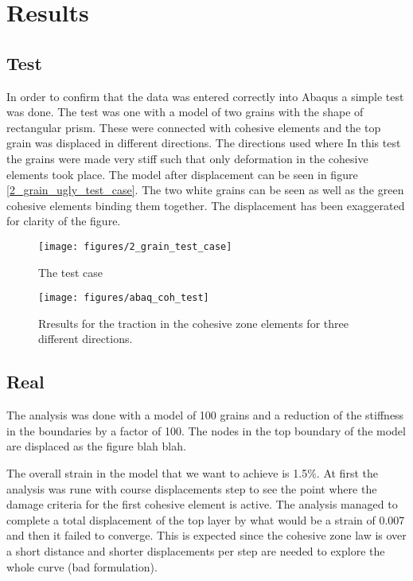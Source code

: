\documentclass[convergence.tex]{subfiles}
\begin{document}
\chapter{Results}

\section{Test}

In order to confirm that the data was entered correctly into Abaqus a simple test was done. The test was one with a model of two grains with the shape of rectangular prism. These were connected with cohesive elements and the top grain was displaced in different directions. The directions used where  In this test the grains were made very stiff such that only deformation in the cohesive elements took place. The model after displacement can be seen in figure \ref{2_grain_ugly_test_case}. The two white grains can be seen as well as the green cohesive elements binding them together. The displacement has been exaggerated for clarity of the figure.

\begin{figure}[ht]
\centering
\texttt{[image: figures/2\_grain\_test\_case]}
\caption{The test case}
\label{fig:test_case}
\end{figure}


\begin{figure}[ht]
\centering
\texttt{[image: figures/abaq\_coh\_test]}
\caption{Rresults for the traction in the cohesive zone elements for three different directions.}
\label{fig:test_case}
\end{figure}

\section{Real}
The analysis was done with a model of 100 grains and a reduction of the stiffness in the boundaries by a factor of 100. The nodes in the top boundary of the model are displaced as the figure blah blah.

The overall strain in the model that we want to achieve is 1.5\%. At first the analysis was rune with course displacements step to see the point where the damage criteria for the first cohesive element is active. The analysis managed to complete a total displacement of the top layer by what would be a strain of 0.007 and then it failed to converge. This is expected since the cohesive zone law is over a short distance and shorter displacements per step are needed to explore the whole curve (bad formulation).
\end{document}
